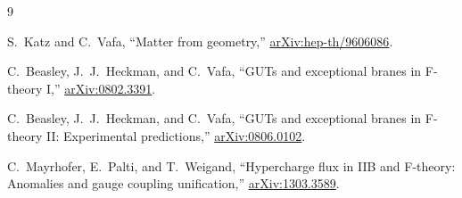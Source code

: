 \documentclass[11pt]{article}
\begin{document}
\begin{thebibliography}{9}

S.~Katz and C.~Vafa,
``Matter from geometry,''
\href{https://arxiv.org/abs/hep-th/9606086}{arXiv:hep-th/9606086}.

C.~Beasley, J.~J.~Heckman, and C.~Vafa,
``GUTs and exceptional branes in F-theory I,''
\href{https://arxiv.org/abs/0802.3391}{arXiv:0802.3391}.

C.~Beasley, J.~J.~Heckman, and C.~Vafa,
``GUTs and exceptional branes in F-theory II: Experimental predictions,''
\href{https://arxiv.org/abs/0806.0102}{arXiv:0806.0102}.

C.~Mayrhofer, E.~Palti, and T.~Weigand,
``Hypercharge flux in IIB and F-theory: Anomalies and gauge coupling
unification,''
\href{https://arxiv.org/abs/1303.3589}{arXiv:1303.3589}.

\end{thebibliography}
\end{document}
